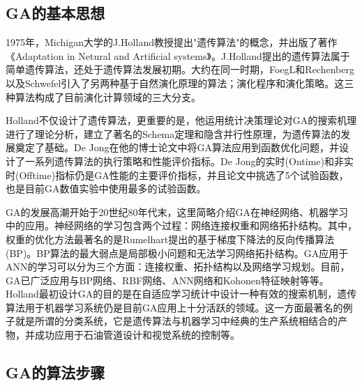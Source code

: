     \subsection{GA的基本思想}
        \par
        1975年，Michigan大学的J.Holland教授提出"遗传算法"的概念，并出版了著作《Adaptation in Netural and Artificial systems》。J.Holland提出的遗传算法属于简单遗传算法，还处于遗传算法发展初期。大约在同一时期，FoegL和Rechenberg以及Schwefel引入了另两种基于自然演化原理的算法；演化程序和演化策略。这三种算法构成了目前演化计算领域的三大分支。
        \par
        Holland不仅设计了遗传算法，更重要的是，他运用统计决策理论对GA的搜索机理进行了理论分析，建立了著名的Schema定理和隐含并行性原理，为遗传算法的发展奠定了基础。De Jong在他的博士论文中将GA算法应用到函数优化问题，并设计了一系列遗传算法的执行策略和性能评价指标。De Jong的实时(Ontime)和非实时(Offtime)指标仍是GA性能的主要评价指标，并且论文中挑选了5个试验函数，也是目前GA数值实验中使用最多的试验函数。
        \par
        GA的发展高潮开始于20世纪80年代末，这里简略介绍GA在神经网络、机器学习中的应用。神经网络的学习包含两个过程：网络连接权重和网络拓扑结构。其中，权重的优化方法最著名的是Rumelhart提出的基于梯度下降法的反向传播算法(BP)。BP算法的最大弱点是局部极小问题和无法学习网络拓扑结构。GA应用于ANN的学习可以分为三个方面：连接权重、拓扑结构以及网络学习规划。目前，GA已广泛应用与BP网络、RBF网络、ANN网络和Kohonen特征映射等等。Holland最初设计GA的目的是在自适应学习统计中设计一种有效的搜索机制，遗传算法用于机器学习系统仍是目前GA应用上十分活跃的领域。这一方面最著名的例子就是所谓的分类系统，它是遗传算法与机器学习中经典的生产系统相结合的产物，并成功应用于石油管道设计和视觉系统的控制等。
    \subsection{GA的算法步骤}
